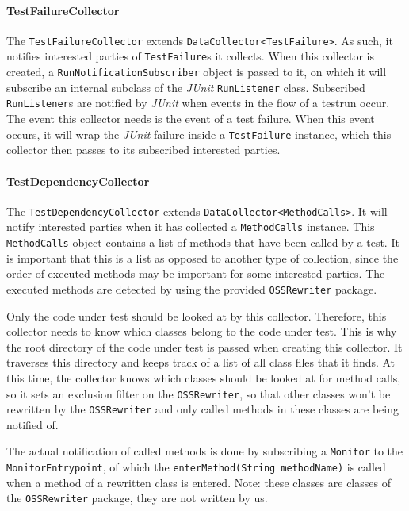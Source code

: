 \documentclass[i2]{oss}
\newcommand{\class}[1]{\texttt{#1}}
\newcommand{\method}[1]{\texttt{#1}}
\newcommand{\junit}{\emph{JUnit }}
\begin{document}
\paragraph{TestFailureCollector} The \class{TestFailureCollector} extends \class{DataCollector<TestFailure>}.
As such, it notifies interested parties of \class{TestFailure}s it collects.
When this collector is created, a \class{RunNotificationSubscriber} object is passed to it, on which it will subscribe an internal subclass of the \junit \class{RunListener} class.
Subscribed \class{RunListener}s are notified by \junit when events in the flow of a testrun occur.
The event this collector needs is the event of a test failure.
When this event occurs, it will wrap the \junit failure inside a \class{TestFailure} instance, which this collector then passes to its subscribed interested parties.

\paragraph{TestDependencyCollector} The \class{TestDependencyCollector} extends \class{DataCollector<MethodCalls>}.
It will notify interested parties when it has collected a \class{MethodCalls} instance.
This \class{MethodCalls} object contains a list of methods that have been called by a test.
It is important that this is a list as opposed to another type of collection, since the order of executed methods may be important for some interested parties.
The executed methods are detected by using the provided \class{OSSRewriter} package.

Only the code under test should be looked at by this collector.
Therefore, this collector needs to know which classes belong to the code under test.
This is why the root directory of the code under test is passed when creating this collector.
It traverses this directory and keeps track of a list of all class files that it finds.
At this time, the collector knows which classes should be looked at for method calls, so it sets an exclusion filter on the \class{OSSRewriter}, so that other classes won't be rewritten by the \class{OSSRewriter} and only called methods in these classes are being notified of.

The actual notification of called methods is done by subscribing a \class{Monitor} to the \class{MonitorEntrypoint}, of which the \method{enterMethod(String methodName)} is called when a method of a rewritten class is entered. Note: these classes are classes of the \class{OSSRewriter} package, they are not written by us.
\end{document}
